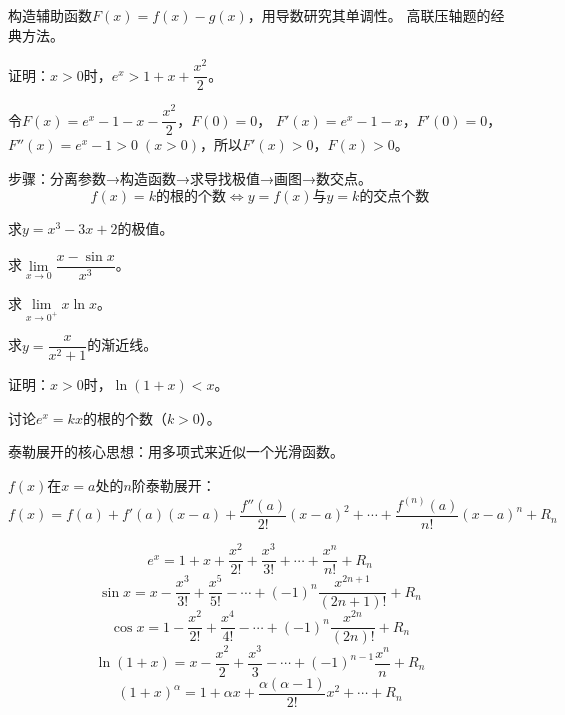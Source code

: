 \documentclass[a4paper,12pt]{ctexart}
\begin{document}

构造辅助函数$F(x)=f(x)-g(x)$，用导数研究其单调性。
高联压轴题的经典方法。

\begin{example}
证明：$x>0$时，$e^x>1+x+\dfrac{x^2}{2}$。
\end{example}
\begin{solution}
令$F(x)=e^x-1-x-\dfrac{x^2}{2}$，$F(0)=0$，
$F'(x)=e^x-1-x$，$F'(0)=0$，
$F''(x)=e^x-1>0\;(x>0)$，所以$F'(x)>0$，$F(x)>0$。
\end{solution}


步骤：分离参数→构造函数→求导找极值→画图→数交点。
\[
f(x)=k\text{的根的个数} \Leftrightarrow y=f(x)\text{与}y=k\text{的交点个数}
\]


\begin{exercise}
\item 求$y=x^3-3x+2$的极值。
\item 求$\lim\limits_{x\to0}\dfrac{x-\sin x}{x^3}$。
\item 求$\lim\limits_{x\to0^+}x\ln x$。
\item 求$y=\dfrac{x}{x^2+1}$的渐近线。
\item 证明：$x>0$时，$\ln(1+x)<x$。
\item 讨论$e^x=kx$的根的个数（$k>0$）。
\end{exercise}

\newpage



泰勒展开的核心思想：用多项式来近似一个光滑函数。

$f(x)$在$x=a$处的$n$阶泰勒展开：
\[
f(x)=f(a)+f'(a)(x-a)+\frac{f''(a)}{2!}(x-a)^2+\cdots+\frac{f^{(n)}(a)}{n!}(x-a)^n+R_n
\]


\[
e^x=1+x+\frac{x^2}{2!}+\frac{x^3}{3!}+\cdots+\frac{x^n}{n!}+R_n
\]
\[
\sin x=x-\frac{x^3}{3!}+\frac{x^5}{5!}-\cdots+(-1)^{n}\frac{x^{2n+1}}{(2n+1)!}+R_n
\]
\[
\cos x=1-\frac{x^2}{2!}+\frac{x^4}{4!}-\cdots+(-1)^{n}\frac{x^{2n}}{(2n)!}+R_n
\]
\[
\ln(1+x)=x-\frac{x^2}{2}+\frac{x^3}{3}-\cdots+(-1)^{n-1}\frac{x^n}{n}+R_n
\]
\[
(1+x)^\alpha=1+\alpha x+\frac{\alpha(\alpha-1)}{2!}x^2+\cdots+R_n
\]

\end{document}
